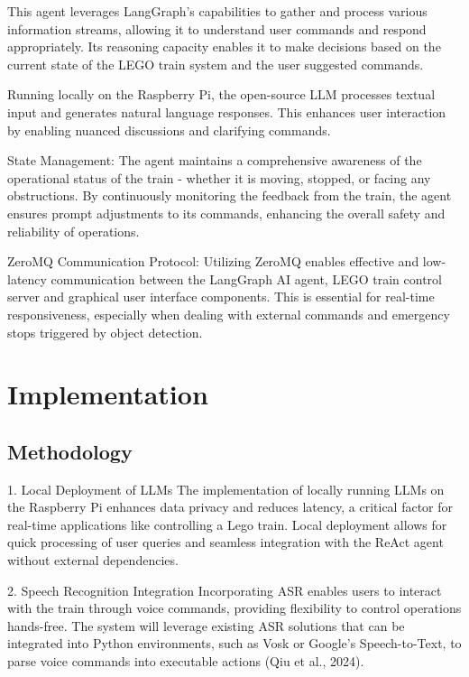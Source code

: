  This agent leverages LangGraph's capabilities to gather and process various information streams, allowing it to understand user commands and respond appropriately. Its reasoning capacity enables it to make decisions based on the current state of the LEGO train system and the user suggested commands. 

 Running locally on the Raspberry Pi, the open-source LLM processes textual input and generates natural language responses. This enhances user interaction by enabling nuanced discussions and clarifying commands.

 
 State Management: The agent maintains a comprehensive awareness of the operational status of the train - whether it is moving, stopped, or facing any obstructions. By continuously monitoring the feedback from the train, the agent ensures prompt adjustments to its commands, enhancing the overall safety and reliability of operations.

 ZeroMQ Communication Protocol: Utilizing ZeroMQ enables effective and low-latency communication between the LangGraph AI agent, LEGO train control server and graphical user interface components. This is essential for real-time responsiveness, especially when dealing with external commands and emergency stops triggered by object detection.

%
%
\section{Implementation}
\label{sec:system_design:implementation}

\subsection{Methodology}

1. Local Deployment of LLMs
The implementation of locally running LLMs on the Raspberry Pi enhances data privacy and reduces latency, a critical factor for real-time applications like controlling a Lego train. Local deployment allows for quick processing of user queries and seamless integration with the ReAct agent without external dependencies.

2. Speech Recognition Integration
Incorporating ASR enables users to interact with the train through voice commands, providing flexibility to control operations hands-free. The system will leverage existing ASR solutions that can be integrated into Python environments, such as Vosk or Google’s Speech-to-Text, to parse voice commands into executable actions (Qiu et al., 2024).

